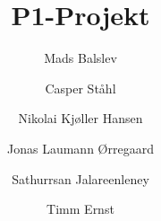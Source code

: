 \title{P1-Projekt}
\author{
  Mads Balslev
  \and
  Casper Ståhl
  \and
  Nikolai Kjøller Hansen
  \and
  Jonas Laumann Ørregaard
  \and
  Sathurrsan Jalareenleney
  \and
  Timm Ernst
}